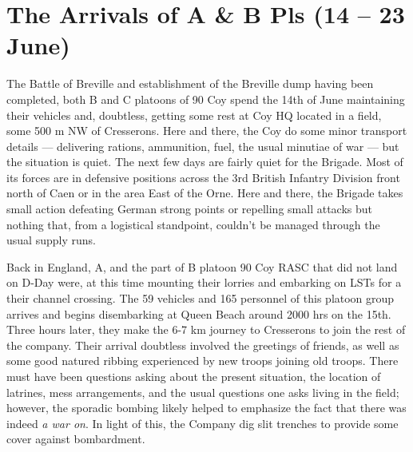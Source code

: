 \documentclass[noraggedright]{turabian-researchpaper}
\begin{document}

\section{The Arrivals of A \& B Pls (14 -- 23 June)}

The Battle of Breville and establishment of the Breville dump having been
completed, both B and C platoons of 90 Coy spend the 14th of June maintaining 
their vehicles and, doubtless, getting some rest at Coy HQ located in a field,
some 500 m NW of Cresserons.  Here and there, the Coy
do some minor transport details --- delivering rations, ammunition, fuel, the
usual minutiae of war --- but the situation is quiet.  The next few days are 
fairly quiet for the Brigade.  Most of its forces are in defensive positions 
across the 3rd British Infantry Division front north of Caen or in the area 
East of the Orne.  Here and there, the Brigade takes small action defeating 
German strong points or repelling small attacks but nothing that, from a 
logistical standpoint, couldn't be managed through the usual supply runs.

Back in England, A, and the part of B platoon 90 Coy RASC that did not land on 
D-Day were, at this time mounting their lorries and embarking on LSTs for a 
their channel crossing.  The 59 vehicles and 165 personnel of this platoon 
group arrives and begins disembarking at Queen Beach around 2000 hrs on the 
15th.  Three 
hours later, they make the 6-7 km journey to Cresserons to join the rest of
the company.  Their arrival doubtless involved the greetings of friends, as
well as some good natured ribbing experienced by new troops joining old 
troops.  There must have been questions asking about the present situation,
the location of latrines, mess arrangements, and the usual questions one asks 
living in the field; however, the sporadic bombing likely helped to emphasize
the fact that there was indeed \textit{a war on}.%
In light of this, the 
Company dig slit trenches to provide some cover against bombardment.  
\end{document}

